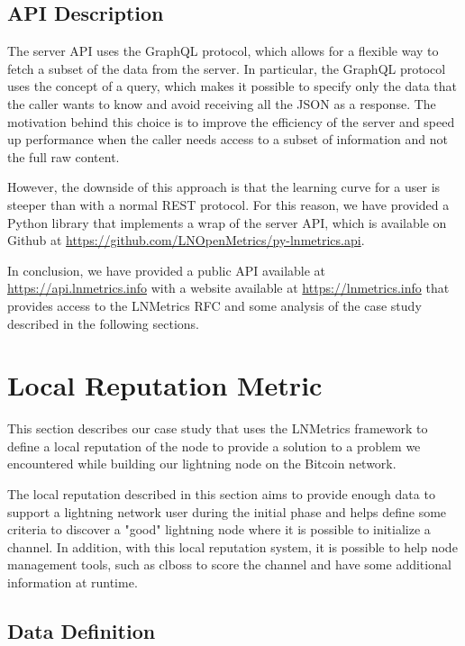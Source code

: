 \subsection{API Description}

The server API uses the GraphQL protocol, which allows for a flexible way 
to fetch a subset of the data from the server. In particular, the GraphQL 
protocol uses the concept of a query, which makes it possible to specify 
only the data that the caller wants to know and avoid receiving all the JSON 
as a response. The motivation behind this choice is to improve the efficiency 
of the server and speed up performance when the caller needs access to a subset
of information and not the full raw content.

However, the downside of this approach is that the learning curve for a user 
is steeper than with a normal REST protocol. For this reason, we have provided
a Python library that implements a wrap of the server API, which is available
on Github at \url{https://github.com/LNOpenMetrics/py-lnmetrics.api}.

In conclusion, we have provided a public API available at \url{https://api.lnmetrics.info} 
with a website available at \url{https://lnmetrics.info} that provides access to the 
LNMetrics RFC and some analysis of the case study described in the 
following sections.

\section{Local Reputation Metric}
\label{sec:demo}

This section describes our case study that uses the LNMetrics framework 
to define a local reputation of the node to provide a solution to a
problem we encountered while building our lightning node on the
Bitcoin network.

The local reputation described in this section aims to provide enough 
data to support a lightning network user during the initial phase and
helps define some criteria to discover a "good" lightning node where 
it is possible to initialize a channel. In addition, with this local 
reputation system, it is possible to help node management tools, such as
clboss \cite{clboss} to score the channel and have some additional 
information at runtime.


\subsection{Data Definition}
\label{sec:data_definition_datadef}

